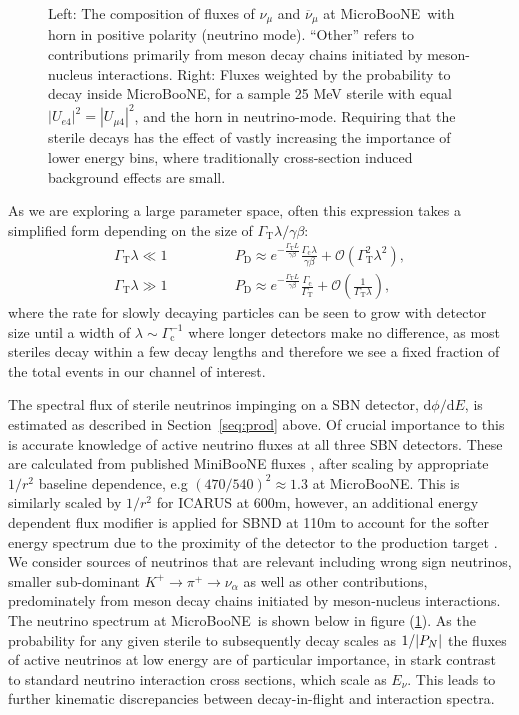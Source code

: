 \documentclass[11pt, a4paper]{article}
\newcommand{\refsec}[1]{Section~\ref{#1}}
\def\muboone{MicroBooNE}
\def\ster{\ensuremath N}
\begin{document}
\begin{figure}[t]
\caption{\label{fig:flux_plots} Left: The composition of fluxes of $\nu_\mu$
and $\overline{\nu}_\mu$ at \muboone\ with horn in positive polarity (neutrino
mode). ``Other'' refers to contributions primarily from meson decay chains
initiated by meson-nucleus interactions. Right: Fluxes weighted by the
probability to decay inside \muboone, for a sample 25 MeV sterile with equal
$|U_{e4}|^2 = |U_{\mu 4}|^2$, and the horn in neutrino-mode. Requiring that the
sterile decays has the effect of vastly increasing the importance of lower
energy bins, where traditionally cross-section induced background effects are
small.}

\end{figure}


As we are exploring a large parameter space, often this expression takes a
simplified form depending on the size of $\Gamma_\text{T}\lambda/\gamma\beta$:
%
\begin{align} 
%
\Gamma_\text{T}\lambda \ll 1\qquad&\qquad P_\text{D} \approx
e^{-\frac{\Gamma_\text{T}L}{\gamma\beta}}\frac{\Gamma_\text{c}\lambda}{\gamma\beta}
+ \mathcal{O}\left(\Gamma_\text{T}^2\lambda^2\right),\label{eq:prob_dec1}\\
%
\Gamma_\text{T}\lambda \gg 1\qquad&\qquad P_\text{D} \approx
e^{-\frac{\Gamma_\text{T}L}{\gamma\beta}}\frac{\Gamma_\text{c}}{\Gamma_\text{T}}
+ \mathcal{O}\left(\frac{1}{\Gamma_\text{T}\lambda}\right),
\label{eq:prob_dec2}
%
\end{align}
%
where the rate for slowly decaying particles can be seen to grow with detector
size until a width of $\lambda\sim\Gamma_\text{c}^{-1}$ where longer detectors
make no difference, as most steriles decay within a few decay lengths and
therefore we see a fixed fraction of the total events in our channel of
interest. 

The spectral flux of sterile neutrinos impinging on a SBN detector, $\mathrm{d}\phi/\mathrm{d}E$, is estimated as described in \refsec{seq:prod} above.
Of crucial importance to this is accurate knowledge of active neutrino fluxes at all three SBN detectors. These are calculated from published MiniBooNE fluxes \cite{AguilarArevalo:2008yp}, after scaling by appropriate
$1/r^2$ baseline dependence, e.g $(470/540)^2 \approx 1.3$ at \muboone. This
is similarly scaled by $1/r^2$ for ICARUS at 600m, however, an additional
energy dependent flux modifier is applied for SBND at 110m to account for the
softer energy spectrum due to the proximity of the detector to the production
target \cite{Antonello:2015lea}. We consider sources of neutrinos that are
relevant including wrong sign neutrinos, smaller sub-dominant $K^+\rightarrow
\pi^+\rightarrow \nu_\alpha$ as well as other contributions, predominately from
meson decay chains initiated by meson-nucleus interactions. The neutrino spectrum at \muboone\ is shown below in figure
(\ref{fig:flux_plots}). As the probability for any given sterile to subsequently decay scales as
$1/|P_{\ster}|$ the fluxes of active neutrinos at low energy are of particular importance, in stark contrast to standard neutrino interaction cross sections, which scale as $E_\nu$. This leads to further kinematic discrepancies between decay-in-flight and interaction spectra. 
\end{document}
